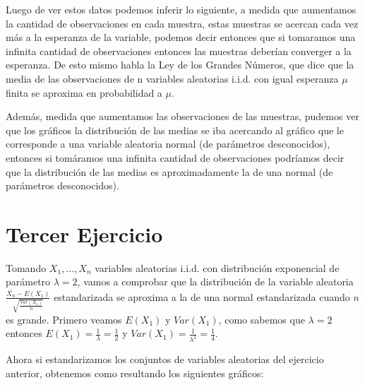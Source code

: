 \documentclass[a4paper]{article}
\begin{document}
	Luego de ver estos datos podemos inferir lo siguiente, a medida que aumentamos la cantidad de observaciones en cada muestra, estas muestras se acercan cada vez m\'as a la esperanza de la variable, podemos decir entonces que si tomaramos una infinita cantidad de observaciones entonces las muestras deber\'ian converger a la esperanza. De esto mismo habla la Ley de los Grandes N\'umeros, que dice que la media de las observaciones de n variables aleatorias i.i.d. con igual esperanza $\mu$ finita se aproxima en probabilidad a $\mu$.
	
	Adem\'as, medida que aumentamos las observaciones de las muestras, pudemos ver que los gr\'aficos la distribuci\'on de las medias se iba acercando al gr\'afico que le corresponde a una variable aleatoria normal (de par\'ametros desconocidos), entonces si tom\'aramos una infinita cantidad de observaciones podr\'iamos decir que la distribuci\'on de las medias es aproximadamente la de una normal (de par\'ametros desconocidos).
	
	\newpage
	
	\section{Tercer Ejercicio}
	
	Tomando $X_1,...,X_n$ variables aleatorias i.i.d. con distribuci\'on exponencial de par\'ametro $\lambda = 2$, vamos a comprobar que la distribuci\'on de la variable aleatoria $\frac{\bar{X_n} - E(X_1)}{\sqrt{\frac{Var(X_1)}{n}}}$ estandarizada se aproxima a la de una normal estandarizada cuando $n$ es grande.
	Primero veamos $E(X_1)$ y $Var(X_1)$, como sabemos que $\lambda = 2$ entonces $E(X_1) = \frac{1}{\lambda} = \frac{1}{2}$ y $Var(X_1) = \frac{1}{\lambda^2} = \frac{1}{4}$.
	\smallskip
	
	Ahora si estandarizamos los conjuntos de variables aleatorias del ejercicio anterior, obtenemos como resultando los siguientes gr\'aficos:
	
\end{document}
